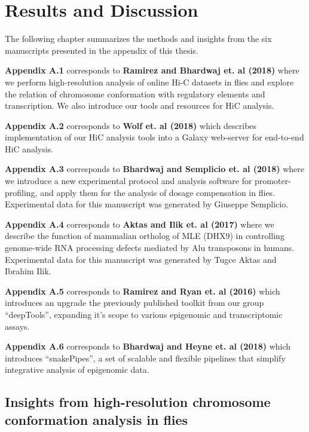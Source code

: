 \documentclass[11pt,twoside]{MPIthesis}
\theoremstyle{definition}
\theoremstyle{definition}
\theoremstyle{definition}
\theoremstyle{remark}
\begin{document}
\chapter{Results and Discussion}\label{results-and-discussion}

The following chapter summarizes the methods and insights from the six
manuscripts presented in the appendix of this thesis.

\textbf{Appendix A.1} corresponds to \textbf{Ramirez and Bhardwaj et. al
(2018)} where we perform high-resolution analysis of online Hi-C
datasets in flies and explore the relation of chromosome conformation
with regulatory elements and transcription. We also introduce our tools
and resources for HiC analysis.

\textbf{Appendix A.2} corresponds to \textbf{Wolf et. al (2018)} which
describes implementation of our HiC analysis tools into a Galaxy
web-server for end-to-end HiC analysis.

\textbf{Appendix A.3} corresponds to \textbf{Bhardwaj and Semplicio et.
al (2018)} where we introduce a new experimental protocol and analysis
software for promoter-profiling, and apply them for the analysis of
dosage compensation in flies. Experimental data for this manuscript was
generated by Giuseppe Semplicio.

\textbf{Appendix A.4} corresponds to \textbf{Aktas and Ilik et. al
(2017)} where we describe the function of mammalian ortholog of MLE
(DHX9) in controlling genome-wide RNA processing defects mediated by Alu
transposons in humans. Experimental data for this manuscript was
generated by Tugce Aktas and Ibrahim Ilik.

\textbf{Appendix A.5} corresponds to \textbf{Ramirez and Ryan et. al
(2016)} which introduces an upgrade the previously published toolkit
from our group ``deepTools'', expanding it's scope to various epigenomic
and transcriptomic assays.

\textbf{Appendix A.6} corresponds to \textbf{Bhardwaj and Heyne et. al
(2018)} which introduces ``snakePipes'', a set of scalable and flexible
pipelines that simplify integrative analysis of epigenomic data.

\section{Insights from high-resolution chromosome conformation analysis
in
flies}\label{insights-from-high-resolution-chromosome-conformation-analysis-in-flies}
\end{document}
